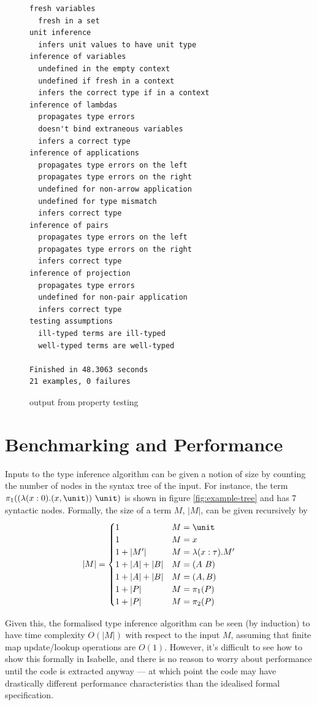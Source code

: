 \begin{figure}
\centering
\begin{verbatim}
fresh variables
  fresh in a set
unit inference
  infers unit values to have unit type
inference of variables
  undefined in the empty context
  undefined if fresh in a context
  infers the correct type if in a context
inference of lambdas
  propagates type errors
  doesn't bind extraneous variables
  infers a correct type
inference of applications
  propagates type errors on the left
  propagates type errors on the right
  undefined for non-arrow application
  undefined for type mismatch
  infers correct type
inference of pairs
  propagates type errors on the left
  propagates type errors on the right
  infers correct type
inference of projection
  propagates type errors
  undefined for non-pair application
  infers correct type
testing assumptions
  ill-typed terms are ill-typed
  well-typed terms are well-typed

Finished in 48.3063 seconds
21 examples, 0 failures
\end{verbatim}
\caption{output from property testing}
\label{fig:tests-output}
\end{figure}

\section{Benchmarking and Performance}
Inputs to the type inference algorithm can be given a notion of size by counting the number of nodes in the syntax tree of the input.
For instance, the term \(\pi_1((\lambda (x : 0). (x, \unit))\ \unit)\) is shown in figure \ref{fig:example-tree} and has 7 syntactic nodes.
Formally, the size of a term \(M\), \(|M|\), can be given recursively by
\[
|M| =
\begin{cases}
1 & M = \unit\\
1 & M = x\\
1 + |M'| & M = \lambda (x : \tau). M'\\
1 + |A| + |B| & M = (A\ B)\\
1 + |A| + |B| & M = (A, B)\\
1 + |P| & M = \pi_1(P)\\
1 + |P| & M = \pi_2(P)\\
\end{cases}
\]

Given this, the formalised type inference algorithm can be seen (by induction) to have time complexity \(O(|M|)\) with respect to the input \(M\), assuming that finite map update/lookup operations are \(O(1)\).
However, it's difficult to see how to show this formally in Isabelle, and there is no reason to worry about performance until the code is extracted anyway --- at which point the code may have drastically different performance characteristics than the idealised formal specification.

